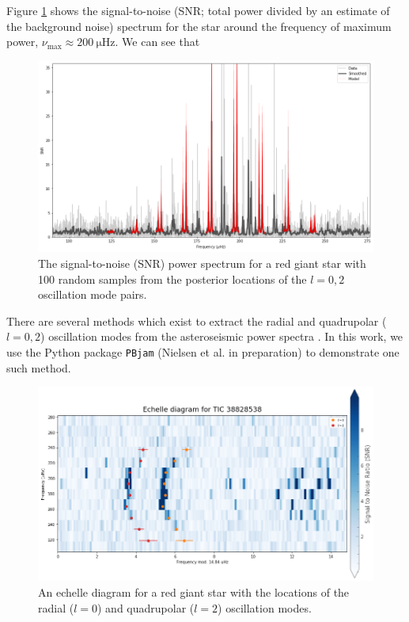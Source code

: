 Figure \ref{fig:peakbag} shows the signal-to-noise (SNR; total power divided by an estimate of the background noise) spectrum for the star around the frequency of maximum power, $\nu_\mathrm{max} \approx \SI{200}{\micro\hertz}$. We can see that  

\begin{figure}
    \centering
    \includegraphics[width=0.8\linewidth]{introduction/images/peakbag.png}
    \caption{The signal-to-noise (SNR) power spectrum for a red giant star with 100 random samples from the posterior locations of the $l=0,2$ oscillation mode pairs.}
    \label{fig:peakbag}
\end{figure}

There are several methods which exist to extract the radial and quadrupolar ($l=0, 2$) oscillation modes from the asteroseismic power spectra \citep[see e.g.][]{Mosser.Belkacem.ea2011, Appourchaux.Chaplin.ea2012, Davies.Aguirre.ea2016}. In this work, we use the Python package \texttt{PBjam} (Nielsen et al. in preparation) to demonstrate one such method.

\begin{figure}
    \centering
    \includegraphics[width=0.8\linewidth]{introduction/images/echelle.png}
    \caption{An echelle diagram for a red giant star with the locations of the radial ($l=0$) and quadrupolar ($l=2$) oscillation modes.}
    \label{fig:echelle}
\end{figure}

